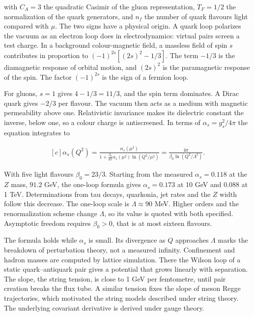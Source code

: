 \documentclass[11pt,oneside]{book}
\newenvironment{centeredalign}{\[\begin{gathered}[c]}{\end{gathered}\]}
\begin{document}
with \(C_A=3\) the quadratic Casimir of the gluon representation, \(T_F=1/2\) the normalization of the quark generators, and \(n_f\) the number of quark flavours light compared with \(\mu\). The two signs have a physical origin. A quark loop polarizes the vacuum as an electron loop does in electrodynamics: virtual pairs screen a test charge. In a background colour-magnetic field, a massless field of spin \(s\) contributes in proportion to \((-1)^{2s}[(2s)^2-1/3]\). The term \(-1/3\) is the diamagnetic response of orbital motion, and \((2s)^2\) is the paramagnetic response of the spin. The factor \((-1)^{2s}\) is the sign of a fermion loop.

For gluons, \(s=1\) gives \(4-1/3=11/3\), and the spin term dominates. A Dirac quark gives \(-2/3\) per flavour. The vacuum then acts as a medium with magnetic permeability above one. Relativistic invariance makes its dielectric constant the inverse, below one, so a colour charge is antiscreened. In terms of \(\alpha_s=g_s^2/4\pi\) the equation integrates to

\begin{centeredalign}
\alpha_s(Q^2)=\frac{\alpha_s(\mu^2)}{1+\frac{\beta_0}{4\pi}\alpha_s(\mu^2)\ln(Q^2/\mu^2)}
=\frac{4\pi}{\beta_0\ln(Q^2/\Lambda^2)}.
\end{centeredalign}

With five light flavours \(\beta_0=23/3\). Starting from the measured \(\alpha_s=0.118\) at the \(Z\) mass, \(91.2\) GeV, the one-loop formula gives \(\alpha_s=0.173\) at 10 GeV and \(0.088\) at 1 TeV. Determinations from tau decays, quarkonia, jet rates and the \(Z\) width follow this decrease. The one-loop scale is \(\Lambda\approx90\) MeV. Higher orders and the renormalization scheme change \(\Lambda\), so its value is quoted with both specified. Asymptotic freedom requires \(\beta_0>0\), that is at most sixteen flavours.

The formula holds while \(\alpha_s\) is small. Its divergence as \(Q\) approaches \(\Lambda\) marks the breakdown of perturbation theory, not a measured infinity. Confinement and hadron masses are computed by lattice simulation. There the Wilson loop of a static quark--antiquark pair gives a potential that grows linearly with separation. The slope, the string tension, is close to 1 GeV per femtometre, until pair creation breaks the flux tube. A similar tension fixes the slope of meson Regge trajectories, which motivated the string models described under string theory. The underlying covariant derivative is derived under gauge theory.
\end{document}
